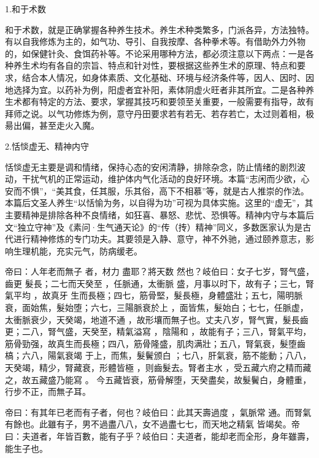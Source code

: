 \documentclass[draft,12pt]{ctexbook}
\begin{document}

1.和于术数

和于术数，就是正确掌握各种养生技术。养生术种类繁多，门派各异，方法独特。有以自我修炼为主的，如气功、导引、自我按摩、各种拳术等。有借助外力外物的，如保健针灸、食饵药补等。不论采用哪种方法，都必须注意以下两点：一是各种养生术均有各自的宗旨、特点和针对性，要根据这些养生术的原理、特点和要求，结合本人情况，如身体素质、文化基础、环境与经济条件等，因人、因时、因地选择为宜。以药补为例，阳虚者宜补阳，素体阴虚火旺者非其所宜。二是各种养生术都有特定的方法、要求，掌握其技巧和要领至关重要，一般需要有指导，故有拜师之说。以气功修炼为例，意守丹田要求若有若无、若存若亡，太过则着相，极昜出偏，甚至走火入魔。

2.恬惔虚无、精神内守

恬惔虚无主要是调和情绪，保持心态的安闲清静，排除杂念，防止情绪的剧烈波动，干扰气机的正常运动，维护体内气化活动的良好环境。本篇“志闲而少欲，心安而不惧”，“美其食，任其服，乐其俗，高下不相慕”等，就是古人推崇的作法。本篇后文圣人养生“以恬愉为务，以自得为功”可视为具体实施。这里的“虚无”，其主要精神是排除各种不良情绪，如狂喜、暴怒、悲忧、恐惧等。精神内守与本篇后文“独立守神”及《素问·生气通天论》的“传（抟）精神”同义，多数医家认为是古代进行精神修炼的专门功夫。其要领是入静、意守，神不外驰，通过颐养意志，影响生理机能，充实元气，防病缓老。


\begin{yuanwen}
帝曰：人年老而無子 者，材力 盡耶？將天数 然也？岐伯曰：女子七岁，腎气盛，齒更 髮長；二七而天癸至 ，任脈通，太衝脈 盛，月事以时下，故有子；三七，腎氣平均 ，故真牙 生而長極；四七，筋骨堅，髮長極，身體盛壯；五七，陽明脈衰，面始焦，髮始堕；六七，三陽脈衰於上 ，面皆焦，髮始白；七七，任脈虚，太衝脈衰少，天癸竭，地道不通 ，故形壤而無子也。丈夫八岁，腎气實，髮長齒更；二八，腎气盛，天癸至，精氣溢寫 ，陰陽和 ，故能有子；三八，腎氣平均，筋骨勁强，故真生而長極；四八，筋骨隆盛，肌肉满壯；五八，腎氣衰，髮堕齒槁；六八，陽氣衰竭 于上，而焦，髮鬢颁白 ；七八，肝氣衰，筋不能動；八八，天癸竭，精少，腎藏衰，形體皆極 ，则齒髮去。腎者主水 ，受五藏六府之精而藏之，故五藏盛乃能寫 。 今五藏皆衰，筋骨解堕，天癸盡矣，故髮鬢白，身體重，行步不正，而無子耳。

帝曰：有其年已老而有子者，何也？岐伯曰：此其天壽過度 ，氣脈常 通。而腎氣有餘也。此雖有子，男不過盡八八，女不過盡七七，而天地之精氣 皆竭矣。帝曰：夫道者，年皆百數，能有子乎？岐伯曰：夫道者，能却老而全形，身年雖壽，能生子也。
\end{yuanwen}
\end{document}
